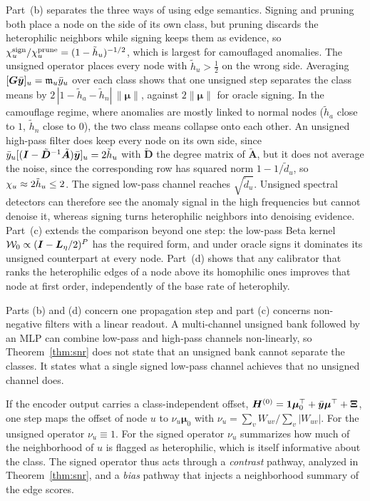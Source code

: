 Part~(b) separates the three ways of using edge semantics.
Signing and pruning both place a node on the side of its own class, but pruning discards the heterophilic neighbors while signing keeps them as evidence, so $\chi^{\mathrm{sign}}_u/\chi^{\mathrm{prune}}_u=(1-\tilde h_u)^{-1/2}$, which is largest for camouflaged anomalies.
The unsigned operator places every node with $\tilde h_u>\tfrac12$ on the wrong side.
Averaging $[\bm G\bar{\bm{y}}]_u=\mathfrak{m}_u\bar y_u$ over each class shows that one unsigned step separates the class means by $2\,|1-\tilde h_a-\tilde h_n|\,\|\bm\mu\|$, against $2\|\bm\mu\|$ for oracle signing.
In the camouflage regime, where anomalies are mostly linked to normal nodes ($\tilde h_a$ close to $1$, $\tilde h_n$ close to $0$), the two class means collapse onto each other.
An unsigned high-pass filter does keep every node on its own side, since $\bar y_u[(\bm I-\tilde{\bm D}^{-1}\tilde{\bm A})\bar{\bm{y}}]_u=2\tilde h_u$ with $\tilde{\bm D}$ the degree matrix of $\tilde{\bm A}$, but it does not average the noise, since the corresponding row has squared norm $1-1/\tilde d_u$, so $\chi_u\approx2\tilde h_u\le2$.
The signed low-pass channel reaches $\sqrt{\tilde d_u}$.
Unsigned spectral detectors can therefore see the anomaly signal in the high frequencies but cannot denoise it, whereas signing turns heterophilic neighbors into denoising evidence.
Part~(c) extends the comparison beyond one step: the low-pass Beta kernel $\mathcal W_0\propto(\bm I-\bm{L}_{\eta}/2)^P$ has the required form, and under oracle signs it dominates its unsigned counterpart at every node.
Part~(d) shows that any calibrator that ranks the heterophilic edges of a node above its homophilic ones improves that node at first order, independently of the base rate of heterophily.

\begin{remark}[Scope]\label{rem:scope}
Parts (b) and (d) concern one propagation step and part (c) concerns non-negative filters with a linear readout.
A multi-channel unsigned bank followed by an MLP can combine low-pass and high-pass channels non-linearly, so Theorem~\ref{thm:snr} does not state that an unsigned bank cannot separate the classes.
It states what a single signed low-pass channel achieves that no unsigned channel does.
\end{remark}

\begin{remark}\label{rem:pathways}
If the encoder output carries a class-independent offset, $\bm H^{(0)}=\bm 1\bm\mu_0^{\top}+\bar{\bm{y}}\bm\mu^{\top}+\bm\Xi$, one step maps the offset of node $u$ to $\nu_u\bm\mu_0$ with $\nu_u=\sum_vW_{uv}/\sum_v|W_{uv}|$.
For the unsigned operator $\nu_u\equiv1$.
For the signed operator $\nu_u$ summarizes how much of the neighborhood of $u$ is flagged as heterophilic, which is itself informative about the class.
The signed operator thus acts through a \emph{contrast} pathway, analyzed in Theorem~\ref{thm:snr}, and a \emph{bias} pathway that injects a neighborhood summary of the edge scores.
\end{remark}

